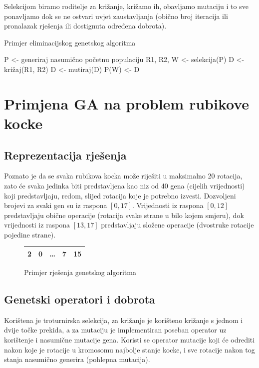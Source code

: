 \documentclass[times, utf8, seminar, numeric]{fer}
\begin{document}
Selekcijom biramo roditelje za križanje, križamo ih, obavljamo mutaciju i to sve ponavljamo dok se ne ostvari uvjet zaustavljanja (obično broj iteracija ili pronalazak rješenja ili dostignuta određena dobrota).

\begin{algorithm}
\begin{algorithmic}[1]
\renewcommand{\algorithmicwhile}{\textbf{dok}}
\renewcommand{\algorithmicdo}{\textbf{radi}}

\caption{Primjer eliminacijskog genetskog algoritma}

\State P <- generiraj nasumično početnu populaciju
	\State R1, R2, W <- selekcija(P) 
	\State D <- križaj(R1, R2) 
	\State D <- mutiraj(D)
	\State P(W) <- D 
\EndWhile
\end{algorithmic}
\end{algorithm}

\section{Primjena GA na problem rubikove kocke}

\subsection{Reprezentacija rješenja}
Poznato je da se svaka rubikova kocka može riješiti u maksimalno 20 rotacija\cite{rubik:god}, zato će svaka jedinka biti predstavljena kao niz od 40 gena (cijelih vrijednosti) koji predstavljaju, redom, slijed rotacija koje je potrebno izvesti. Dozvoljeni brojevi za svaki gen su iz raspona $[0, 17]$.
Vrijednosti iz raspona $[0, 12]$ predstavljaju obične operacije (rotacija svake strane u bilo kojem smjeru), dok vrijednosti iz raspona $[13, 17]$ predstavljaju složene operacije (dvostruke rotacije pojedine strane).

\begin{figure}
\centering
\begin{tabular}{|c|c|c|c|c|}\hline
2 & 0 & \dots & 7 & 15\\\hline
\end{tabular}
\caption{Primjer rješenja genetskog algoritma}

\end{figure}

\subsection{Genetski operatori i dobrota}
Korištena je troturnirska selekcija, za križanje je korišteno križanje s jednom i dvije točke prekida, a za mutaciju je implementiran poseban operator uz korištenje i nasumične mutacije gena.
Koristi se operator mutacije koji će odrediti nakon koje je rotacije u kromosomu najbolje stanje kocke, i sve rotacije nakon tog stanja nasumično generira (pohlepna mutacija).
\end{document}
